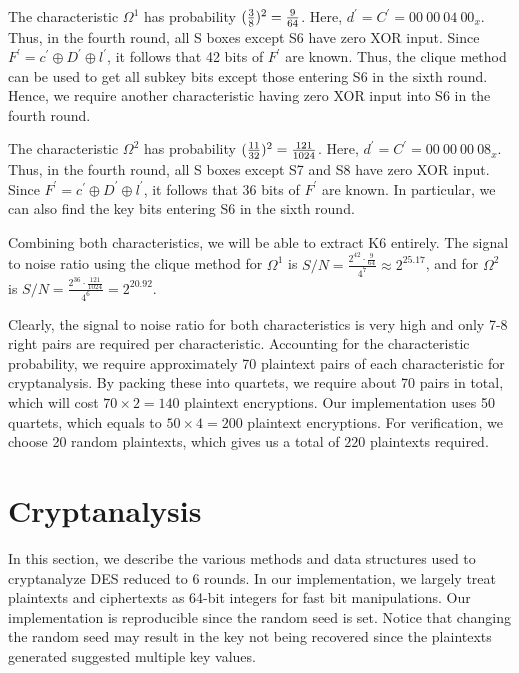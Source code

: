 \documentclass[journal,12pt,twocolumn]{IEEEtran}
\begin{document}
The characteristic \(\Omega^1\) has probability \((\frac{3}{8})^2 =
\frac{9}{64}\). Here, \(d^\prime = C^\prime = 00\ 00\ 04\ 00_x\). Thus, in the
fourth round, all S boxes except S6 have zero XOR input. Since \(F^\prime =
c^\prime \oplus D^\prime \oplus l^\prime\), it follows that 42 bits of
\(F^\prime\) are known. Thus, the clique method
\cite{bihamDifferentialCryptanalysisDESlike1991} can be used to get all subkey
bits except those entering S6 in the sixth round. Hence, we require another
characteristic having zero XOR input into S6 in the fourth round.

The characteristic \(\Omega^2\) has probability \((\frac{11}{32})^2 =
\frac{121}{1024}\). Here, \(d^\prime = C^\prime = 00\ 00\ 00\ 08_x\). Thus, in
the fourth round, all S boxes except S7 and S8 have zero XOR input. Since
\(F^\prime = c^\prime \oplus D^\prime \oplus l^\prime\), it follows that 36 bits
of \(F^\prime\) are known. In particular, we can also find the key bits entering
S6 in the sixth round.

Combining both characteristics, we will be able to extract K6 entirely. The
signal to noise ratio using the clique method for \(\Omega^1\) is \(S/N =
\frac{2^{42} \cdot \frac{9}{64}}{4^7} \approx 2^{25.17}\), and for \(\Omega^2\)
is \(S/N = \frac{2^{36} \cdot \frac{121}{1024}}{4^6} = 2^{20.92}\).

Clearly, the signal to noise ratio for both characteristics is very high and
only 7-8 right pairs are required per characteristic. Accounting for the
characteristic probability, we require approximately 70 plaintext pairs of each
characteristic for cryptanalysis. By packing these into quartets, we require
about 70 pairs in total, which will cost \(70 \times 2 = 140\) plaintext
encryptions. Our implementation uses 50 quartets, which equals to \(50 \times 4
= 200\) plaintext encryptions. For verification, we choose 20 random plaintexts,
which gives us a total of \(220\) plaintexts required.

\section{Cryptanalysis}
\label{sec:recovery}

In this section, we describe the various methods and data structures used to
cryptanalyze DES reduced to 6 rounds. In our implementation, we largely treat
plaintexts and ciphertexts as 64-bit integers for fast bit manipulations. Our
implementation is reproducible since the random seed is set. Notice that
changing the random seed may result in the key not being recovered since the
plaintexts generated suggested multiple key values.
\end{document}

